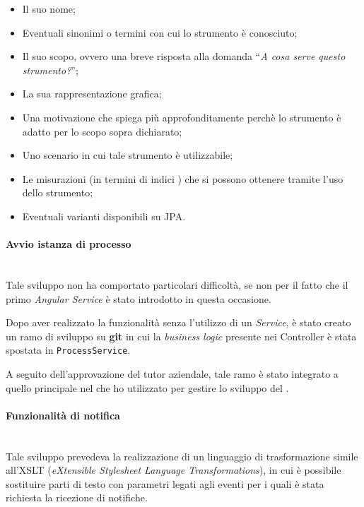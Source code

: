 \begin{itemize}
\item Il suo nome;
\item Eventuali sinonimi o termini con cui lo strumento è conosciuto;
\item Il suo scopo, ovvero una breve risposta alla domanda ``\emph{A cosa
  serve questo strumento?}'';
\item La sua rappresentazione grafica;
\item Una motivazione che spiega più approfonditamente perchè lo strumento è
  adatto per lo scopo sopra dichiarato;
\item Uno scenario in cui tale strumento è utilizzabile;
\item Le misurazioni (in termini di indici ) che si possono
  ottenere tramite l'uso dello strumento;
\item Eventuali varianti disponibili su JPA.
\end{itemize}

\paragraph{Avvio istanza di processo} \mbox{} \\

Tale sviluppo non ha comportato particolari difficoltà, se non per il fatto che
il primo \emph{Angular Service} è stato introdotto in questa occasione.

Dopo aver realizzato la funzionalità senza l'utilizzo di un \emph{Service}, è
stato creato un ramo di sviluppo su \textbf{git} in cui la \emph{business
logic} presente nei Controller è stata spostata in \texttt{ProcessService}.

A seguito dell'approvazione del tutor aziendale, tale ramo è stato integrato
a quello principale nel  che ho utilizzato per gestire lo
sviluppo del \FREND{}.

\paragraph{Funzionalità di notifica} \mbox{} \\

Tale sviluppo prevedeva la realizzazione di un linguaggio di trasformazione
simile all'XSLT (\emph{eXtensible Stylesheet Language Transformations}), in
cui è possibile sostituire parti di testo con parametri legati agli eventi
per i quali è stata richiesta la ricezione di notifiche.

